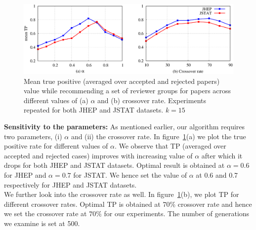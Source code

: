 \begin{figure}
\centering
\includegraphics[scale = 0.35]{./texfiles/Chapter_4/cikm_17/figures/param_estimate.eps}
\caption{\label{fig:param_estimte} Mean true positive (averaged over accepted and rejected papers) value while recommending a set of reviewer groups for papers across different values 
of (a) $\alpha$ and (b) crossover rate. Experiments repeated for both JHEP and JSTAT datasets. $k = 15$}
\vspace{4mm}
\end{figure}

{\bf Sensitivity to the parameters:}
As mentioned earlier, our algorithm requires two parameters, (i) $\alpha$ and (ii) the crossover rate. In figure~\ref{fig:param_estimte}(a) we plot the true positive rate 
for different values of $\alpha$. We observe that TP (averaged over accepted and rejected cases) improves with increasing value of $\alpha$ after which it drops for 
both JHEP and JSTAT datasets. Optimal result is obtained at $\alpha = 0.6$ for JHEP and $\alpha = 0.7$ for JSTAT. 
We hence set the value of $\alpha$ at 0.6 and 0.7 respectively for JHEP and JSTAT datasets. \\
We further look into the crossover rate as well. In figure~\ref{fig:param_estimte}(b), we plot TP for different crossover rates. 
Optimal TP is obtained at 70\% crossover rate and hence we set the crossover rate at $70\%$ for our experiments. The number of generations we examine is set at 500.\\ 

